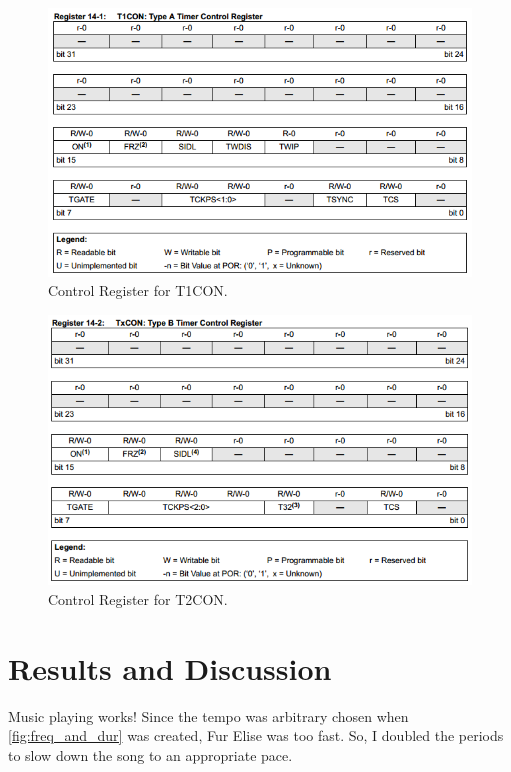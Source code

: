 \documentclass[11pt]{article}
\begin{document}
\begin{figure}[h!]
\centering
\includegraphics[scale=0.8]{T1CON.png}
\caption{Control Register for T1CON.}
\label{fig:t1con}
\end{figure} 

\begin{figure}[h!]
\centering
\includegraphics[scale=0.8]{T2CON.png}
\caption{Control Register for T2CON.}
\label{fig:t2con}
\end{figure} 


\clearpage

\section{Results and Discussion}

Music playing works! Since the tempo was arbitrary chosen when \ref{fig:freq_and_dur} was created, Fur Elise was too fast. So, I doubled the periods to slow down the song to an appropriate pace. \\
\end{document}
